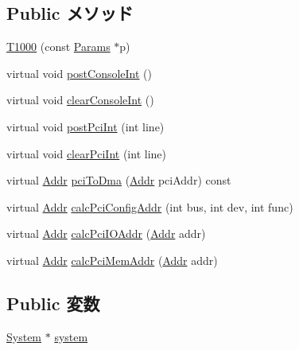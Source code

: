 \subsection*{Public メソッド}
\begin{DoxyCompactItemize}
\item 
\hyperlink{classT1000_a08823bfcfa87c58789ccb0d6f64f2551}{T1000} (const \hyperlink{classT1000_abc8ac05350758af915732ecded3a736e}{Params} $\ast$p)
\item 
virtual void \hyperlink{classT1000_a5b278cebc0a62bc2195edf27f059ab1a}{postConsoleInt} ()
\item 
virtual void \hyperlink{classT1000_ad38e46034c079c8e765d3ac7eb99337d}{clearConsoleInt} ()
\item 
virtual void \hyperlink{classT1000_a545d1445357706d7259aa73104f44222}{postPciInt} (int line)
\item 
virtual void \hyperlink{classT1000_a0d98ea2b236bb883fa15d63a59a2ec9e}{clearPciInt} (int line)
\item 
virtual \hyperlink{base_2types_8hh_af1bb03d6a4ee096394a6749f0a169232}{Addr} \hyperlink{classT1000_a87078b3d3a28ae134f6736337e90dac3}{pciToDma} (\hyperlink{base_2types_8hh_af1bb03d6a4ee096394a6749f0a169232}{Addr} pciAddr) const 
\item 
virtual \hyperlink{base_2types_8hh_af1bb03d6a4ee096394a6749f0a169232}{Addr} \hyperlink{classT1000_a5b8797a83289cb5fd895c9a5dc7eae6f}{calcPciConfigAddr} (int bus, int dev, int func)
\item 
virtual \hyperlink{base_2types_8hh_af1bb03d6a4ee096394a6749f0a169232}{Addr} \hyperlink{classT1000_a83afd16479598cfaeb035fd30eeedd8b}{calcPciIOAddr} (\hyperlink{base_2types_8hh_af1bb03d6a4ee096394a6749f0a169232}{Addr} addr)
\item 
virtual \hyperlink{base_2types_8hh_af1bb03d6a4ee096394a6749f0a169232}{Addr} \hyperlink{classT1000_aa2acd9bf04ba56b380e7812ce29971b5}{calcPciMemAddr} (\hyperlink{base_2types_8hh_af1bb03d6a4ee096394a6749f0a169232}{Addr} addr)
\end{DoxyCompactItemize}
\subsection*{Public 変数}
\begin{DoxyCompactItemize}
\item 
\hyperlink{classSystem}{System} $\ast$ \hyperlink{classT1000_af27ccd765f13a4b7bd119dc7579e2746}{system}
\end{DoxyCompactItemize}


